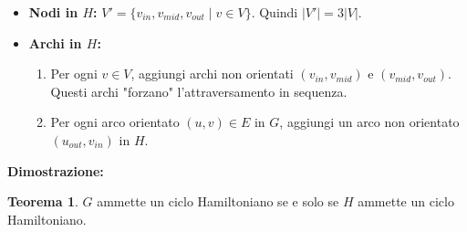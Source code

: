 \documentclass[a4paper]{article}
\theoremstyle{definition} %
\newtheorem{theorem}{Teorema}
\begin{document}
\begin{itemize}
    \item \textbf{Nodi in $H$:} $V' = \{v_{in}, v_{mid}, v_{out} \mid v \in V\}$. Quindi $|V'| = 3|V|$.
    \item \textbf{Archi in $H$:}
    \begin{enumerate}
        \item Per ogni $v \in V$, aggiungi archi non orientati $(v_{in}, v_{mid})$ e $(v_{mid}, v_{out})$. Questi archi "forzano" l'attraversamento in sequenza.
        \item Per ogni arco orientato $(u, v) \in E$ in $G$, aggiungi un arco non orientato $(u_{out}, v_{in})$ in $H$.
    \end{enumerate}
\end{itemize}

\textbf{Dimostrazione:}
\begin{theorem}
$G$ ammette un ciclo Hamiltoniano se e solo se $H$ ammette un ciclo Hamiltoniano.
\end{theorem}
\end{document}
